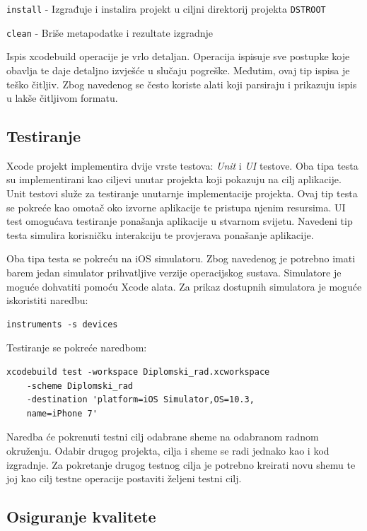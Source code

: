 \documentclass[times, utf8, diplomski, numeric]{fer}
\begin{document}
\begin{appendices}
\verb|install| - Izgrađuje i instalira projekt u ciljni direktorij projekta \verb|DSTROOT|

\verb|clean| - Briše metapodatke i rezultate izgradnje

Ispis xcodebuild operacije je vrlo detaljan. Operacija ispisuje sve postupke koje obavlja te daje detaljno izvješće u slučaju pogreške. Međutim, ovaj tip ispisa je teško čitljiv. Zbog navedenog se često koriste alati koji parsiraju i prikazuju ispis u lakše čitljivom formatu.

\subsection{Testiranje} \label{TestiranjeXcodeBuild}

Xcode projekt implementira dvije vrste testova: \textit{Unit} i \textit{UI} testove. Oba tipa testa su implementirani kao ciljevi unutar projekta koji pokazuju na cilj aplikacije. Unit testovi služe za testiranje unutarnje implementacije projekta. Ovaj tip testa se pokreće kao omotač oko izvorne aplikacije te pristupa njenim resursima. UI test omogućava testiranje ponašanja aplikacije u stvarnom svijetu. Navedeni tip testa simulira korisničku interakciju te provjerava ponašanje aplikacije.

Oba tipa testa se pokreću na iOS simulatoru. Zbog navedenog je potrebno imati barem jedan simulator prihvatljive verzije operacijskog sustava. Simulatore je moguće dohvatiti pomoću Xcode alata. Za prikaz dostupnih simulatora je moguće iskoristiti naredbu:

\begin{verbatim}
instruments -s devices
\end{verbatim}

Testiranje se pokreće naredbom:

\begin{verbatim}
xcodebuild test -workspace Diplomski_rad.xcworkspace
    -scheme Diplomski_rad
    -destination 'platform=iOS Simulator,OS=10.3,
    name=iPhone 7'
\end{verbatim}

Naredba će pokrenuti testni cilj odabrane sheme na odabranom radnom okruženju. Odabir drugog projekta, cilja i sheme se radi jednako kao i kod izgradnje. Za pokretanje drugog testnog cilja je potrebno kreirati novu shemu te joj kao cilj testne operacije postaviti željeni testni cilj.

\subsection{Osiguranje kvalitete} \label{OsiguranjeKvaliteteImplementacija}


\end{appendices}
\end{document}
